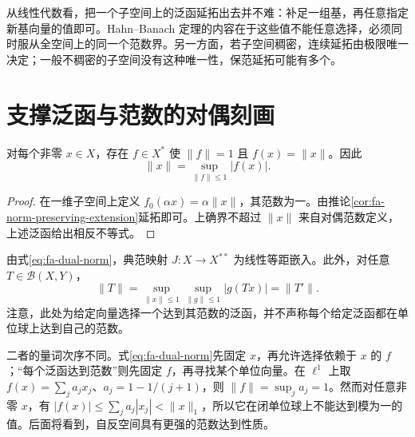 \documentclass[UTF8,12pt,a4paper,fontset=fandol]{ctexbook}
\begin{document}
从线性代数看，把一个子空间上的泛函延拓出去并不难：补足一组基，再任意指定新基向量的值即可。Hahn--Banach 定理的内容在于这些值不能任意选择，必须同时服从全空间上的同一个范数界。另一方面，若子空间稠密，连续延拓由极限唯一决定；一般不稠密的子空间没有这种唯一性，保范延拓可能有多个。

\section{支撑泛函与范数的对偶刻画}
\begin{proposition}\label{prop:fa-norming-functional}
对每个非零 $x\in X$，存在 $f\in X^*$ 使 $\|f\|=1$ 且 $f(x)=\|x\|$。因此
\begin{equation}
 \|x\|=\sup_{\|f\|\leq1}|f(x)|.
 \label{eq:fa-dual-norm}
\end{equation}
\end{proposition}
\begin{proof}
在一维子空间上定义 $f_0(\alpha x)=\alpha\|x\|$，其范数为一。由推论\ref{cor:fa-norm-preserving-extension}延拓即可。上确界不超过 $\|x\|$ 来自对偶范数定义，上述泛函给出相反不等式。
\end{proof}
由式\eqref{eq:fa-dual-norm}，典范映射 $J:X\to X^{**}$ 为线性等距嵌入。此外，对任意 $T\in\mathcal B(X,Y)$，
\[
 \|T\|=\sup_{\|x\|\leq1}\sup_{\|g\|\leq1}|g(Tx)|=\|T'\|.
\]
注意，此处为给定向量选择一个达到其范数的泛函，并不声称每个给定泛函都在单位球上达到自己的范数。

二者的量词次序不同。式\eqref{eq:fa-dual-norm}先固定 $x$，再允许选择依赖于 $x$ 的 $f$；“每个泛函达到范数”则先固定 $f$，再寻找某个单位向量。在 $\ell^1$ 上取 $f(x)=\sum_j a_jx_j$、$a_j=1-1/(j+1)$，则 $\|f\|=\sup_ja_j=1$。然而对任意非零 $x$，有 $|f(x)|\leq\sum_ja_j|x_j|<\|x\|_1$，所以它在闭单位球上不能达到模为一的值。后面将看到，自反空间具有更强的范数达到性质。
\end{document}
